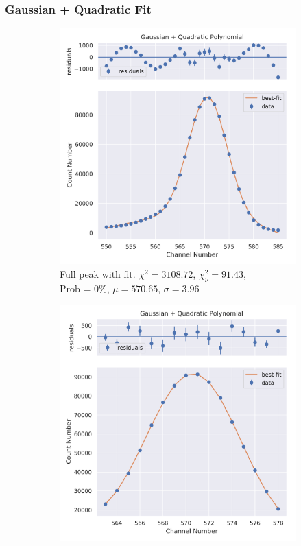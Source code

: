 \documentclass[11pt,a4paper]{article}
\begin{document}
\subsubsection{Gaussian + Quadratic Fit}
\begin{figure}[H]
  \centering
  \begin{subfigure}{.5\linewidth}
    \centering
    \includegraphics[width=\linewidth]{./Images/Barium133/Quad/Quad_1_Full.png}
    \caption{Full peak with fit. $\chi^2 = 3108.72$, $\chi^2_\nu = 91.43$, \\ Prob = 0\%, $\mu = 570.65$, $\sigma = 3.96$}
  \end{subfigure}%
  \begin{subfigure}{.5\linewidth}
    \centering
    \includegraphics[width=\linewidth]{./Images/Barium133/Quad/Quad_1_Zoom.png}

\end{subfigure}
\end{figure}
\end{document}
